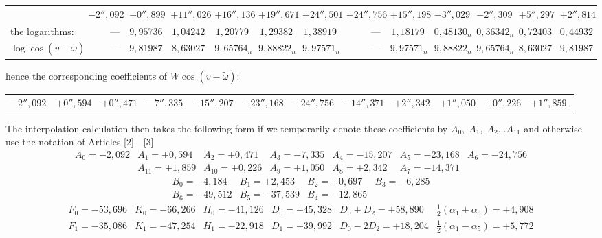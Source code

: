 \begin{landscape}
\begin{center}
\begin{tabular}{@{}l*{12}{r}@{}}
&\(-2''{,}092\)&\(+0''{,}899\)&\(+11''{,}026\)&\(+16''{,}136\)&\(+19''{,}671\)&\(+24''{,}501\)&\(+24''{,}756\)&\(+15''{,}198\)&\(-3''{,}029\)&\(-2''{,}309\)&\(+5''{,}297\)&\(+2''{,}814\)\\[4pt]
the logarithms:&\(\text{—}\)&\(9{,}95736\)&\(1{,}04242\)&\(1{,}20779\)&\(1{,}29382\)&\(1{,}38919\)&\(\text{—}\)&\(1{,}18179\)&\(0{,}48130_n\)&\(0{,}36342_n\)&\(0{,}72403\)&\(0{,}44932\)\\[4pt]
\(\log\cos(v-\tilde\omega)\)&\(\text{—}\)&\(9{,}81987\)&\(8{,}63027\)&\(9{,}65764_n\)&\(9{,}88822_n\)&\(9{,}97571_n\)&\(\text{—}\)&\(9{,}97571_n\)&\(9{,}88822_n\)&\(9{,}65764_n\)&\(8{,}63027\)&\(9{,}81987\)
\end{tabular}
\endgroup
\end{center}
\noindent hence the corresponding coefficients of \(W\cos(v-\tilde\omega)\):
\begin{center}
\begingroup\fontsize{9}{12}\selectfont\setlength{\tabcolsep}{4pt}
\begin{tabular}{@{}*{12}{r}@{}}
\(-2''{,}092\)&\(+0''{,}594\)&\(+0''{,}471\)&\(-7''{,}335\)&\(-15''{,}207\)&\(-23''{,}168\)&\(-24''{,}756\)&\(-14''{,}371\)&\(+2''{,}342\)&\(+1''{,}050\)&\(+0''{,}226\)&\(+1''{,}859\).
\end{tabular}
\endgroup
\end{center}
\par\noindent\hspace*{\parindent}The interpolation calculation then takes the following form if we temporarily denote these coefficients by \(A_0,\;A_1,\;A_2\ldots A_{11}\) and otherwise use the notation of Articles [2]—[3]
\[
\begin{array}{rrrrrrr}
A_0=-2{,}092&A_1=+0{,}594&A_2=+0{,}471&A_3=-7{,}335&A_4=-15{,}207&A_5=-23{,}168&A_6=-24{,}756\\
&A_{11}=+1{,}859&A_{10}=+0{,}226&A_9=+1{,}050&A_8=+2{,}342&A_7=-14{,}371&
\end{array}
\]
\[
\begin{array}{rrrr}
B_0=-4{,}184&B_1=+2{,}453&B_2=+0{,}697&B_3=-6{,}285\\
B_6=-49{,}512&B_5=-37{,}539&B_4=-12{,}865&
\end{array}
\]
\[
\begin{array}{rrrrrr}
F_0=-53{,}696&K_0=-66{,}266&H_0=-41{,}126&D_0=+45{,}328&D_0+D_2=+58{,}890&\frac12(\alpha_1+\alpha_5)=+4{,}908\\
F_1=-35{,}086&K_1=-47{,}254&H_1=-22{,}918&D_1=+39{,}992&D_0-2D_2=+18{,}204&\frac12(\alpha_1-\alpha_5)=+5{,}772\\

\end{array}\]
\end{landscape}
